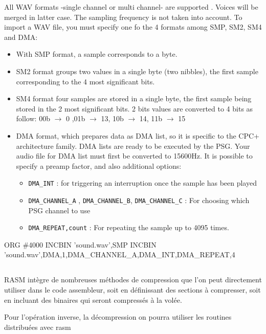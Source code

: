 
\begin{xen}

All WAV formats -single channel or multi channel- are supported . Voices will be merged in latter case. The sampling frequency is not taken into account.  To import a WAV file, you must specify one fo the 4 formats among SMP, SM2, SM4 and DMA:
\begin{itemize}
\item With SMP format, a sample corresponds to a byte.
\item SM2 format groups two values in a single byte (two nibbles), the first sample corresponding to the 4 most significant bits.
\item SM4 format four samples are stored in a single byte, the first sample being stored in the 2 most significant bits. 2 bits values are converted to 4 bits as follow: 00b $\rightarrow$ 0 ,01b $\rightarrow$ 13, 10b $\rightarrow$ 14, 11b $\rightarrow$ 15
\item DMA format, which prepares data as DMA list, so it is specific to the CPC+ architecture family. DMA lists are ready to be executed by the PSG. Your audio file for DMA list must first be converted to 15600Hz.
It is possible to specify a preamp factor, and also additional options:
  \begin{itemize}
    \item \texttt{DMA\_INT} : for triggering an interruption once the sample has been played
    \item \texttt{DMA\_CHANNEL\_A} , \texttt{DMA\_CHANNEL\_B}, \texttt{DMA\_CHANNEL\_C} : For choosing which PSG channel to use
    \item \texttt{DMA\_REPEAT,count} : For repeating the sample up to 4095 times.
  \end{itemize}
\end{itemize}

\end{xen}

\begin{code}
ORG \#4000
INCBIN 'sound.wav',SMP
INCBIN 'sound.wav',DMA,1,DMA_CHANNEL_A,DMA_INT,DMA_REPEAT,4
\end{code}

\subsection{}

\begin{xfr}
RASM intègre de nombreuses méthodes de compression que l'on peut directement utiliser dans le code assembleur, soit en définissant des sections à compresser, soit en incluant des binaires qui seront compressés à la volée.

Pour l'opération inverse, la décompression on pourra utiliser les routines distribuées avec rasm
\end{xfr}

